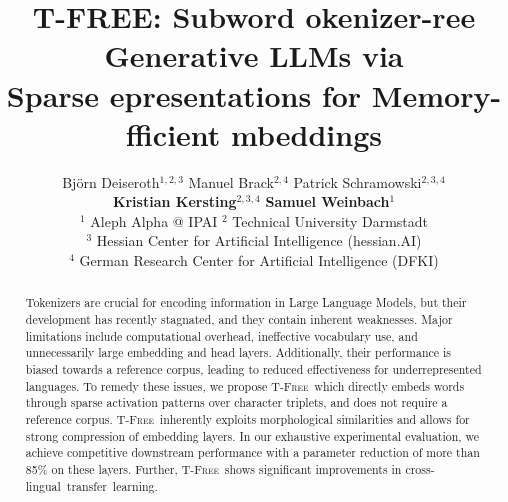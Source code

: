 \documentclass[11pt]{article}
\title{T-FREE: Subword \emphtit{T}okenizer-\emphtit{F}ree Generative LLMs via\\ 
Sparse \emphtit{R}epresentations for Memory-\emphtit{E}fficient \emphtit{E}mbeddings}
\author{Björn Deiseroth$^{1,2,3}$  \quad
  Manuel Brack$^{2,4}$ \quad
  Patrick Schramowski$^{2,3,4}$ \quad
 \\
  \textbf{Kristian Kersting}$^{2,3,4}$\quad
  \textbf{Samuel Weinbach}$^{1}$ 
         \\
         $^1$ Aleph Alpha @ IPAI \hspace{.35cm} $^2$ Technical University Darmstadt\\
         $^3$ Hessian Center for Artificial Intelligence (hessian.AI) \\
          $^4$ German Research Center for Artificial Intelligence (DFKI) \\
         }
\newcommand{\method}{\textsc{T-Free}}
\begin{document}
\maketitle

\begin{abstract}
Tokenizers are crucial for encoding information in Large Language Models, but their development has recently stagnated, and they contain inherent weaknesses. Major limitations include computational overhead, ineffective vocabulary use, and unnecessarily large embedding and head layers. Additionally, their performance is biased towards a reference corpus, leading to reduced effectiveness for underrepresented languages.
%
To remedy these issues, we propose \method\, which directly embeds words through sparse activation patterns over character triplets, and does not require a reference corpus. 
\method\ inherently exploits morphological similarities and allows for strong compression of embedding layers. 
In our exhaustive experimental evaluation, we achieve competitive downstream performance with a parameter reduction 
of more than 85\% on these layers.
Further, \method\ shows significant improvements in \mbox{cross-lingual transfer learning.}

\end{abstract}
\end{document}
